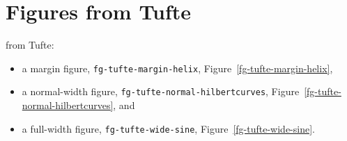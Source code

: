 %
\section{Figures from Tufte}
\label{chap-Figures-Tufte}

  from Tufte:
\begin{itemize}
\item
a margin figure, {\tt fg-tufte-margin-helix}, Figure~\ref{fg-tufte-margin-helix}, 
\item
a normal-width figure, {\tt fg-tufte-normal-hilbertcurves}, Figure~\ref{fg-tufte-normal-hilbertcurves}, and
\item
a full-width figure, {\tt fg-tufte-wide-sine}, Figure~\ref{fg-tufte-wide-sine}.
\end{itemize}





\lipsum[2]
